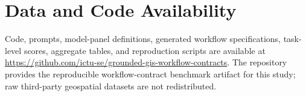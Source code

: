 \documentclass[12pt]{gsis}  %
\begin{document}
\section*{Data and Code Availability}

Code, prompts, model-panel definitions, generated workflow specifications, task-level scores, aggregate tables, and reproduction scripts are available at \url{https://github.com/ictu-se/grounded-gis-workflow-contracts}. The repository provides the reproducible workflow-contract benchmark artifact for this study; raw third-party geospatial datasets are not redistributed.



\end{document}
